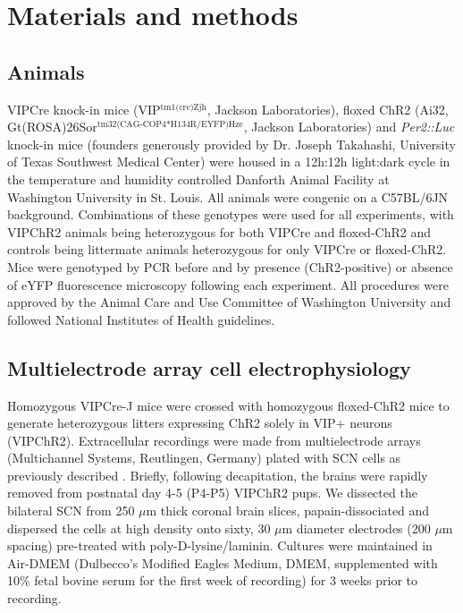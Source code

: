 \section{Materials and methods}

\subsection*{Animals}
VIPCre knock-in mice (VIP$^{\text{tm1(cre)Zjh}}$, Jackson Laboratories), floxed ChR2 (Ai32, Gt(ROSA)26Sor$^\text{tm32(CAG-COP4*H134R/EYFP)Hze}$, Jackson Laboratories) and \textit{Per2::Luc} \cite{Yoo2004} knock-in mice (founders generously provided by Dr. Joseph Takahashi, University of Texas Southwest Medical Center) were housed in a 12h:12h light:dark cycle in the temperature and humidity controlled Danforth Animal Facility at Washington University in St. Louis.
All animals were congenic on a C57BL/6JN background.
Combinations of these genotypes were used for all experiments, with VIPChR2 animals being heterozygous for both VIPCre and floxed-ChR2 and controls being littermate animals heterozygous for only VIPCre or floxed-ChR2.
Mice were genotyped by PCR before and by presence (ChR2-positive) or absence of eYFP fluorescence microscopy following each experiment.
All procedures were approved by the Animal Care and Use Committee of Washington University and followed National Institutes of Health guidelines.

\subsection*{Multielectrode array cell electrophysiology}
Homozygous VIPCre-J mice were crossed with homozygous floxed-ChR2 mice to generate heterozygous litters expressing ChR2 solely in VIP+ neurons (VIPChR2).
Extracellular recordings were made from multielectrode arrays (Multichannel Systems, Reutlingen, Germany) plated with SCN cells as previously described \cite{Aton2005, Webb2012, Freeman2013a}.
Briefly, following decapitation, the brains were rapidly removed from postnatal day 4-5 (P4-P5) VIPChR2 pups.
We dissected the bilateral SCN from 250 $\mu$m thick coronal brain slices, papain-dissociated and dispersed the cells at high density onto sixty, 30 $\mu$m diameter electrodes (200 $\mu$m spacing) pre-treated with poly-D-lysine/laminin.
Cultures were maintained in Air-DMEM (Dulbecco’s Modified Eagles Medium, DMEM, supplemented with 10\% fetal bovine serum for the first week of recording) for 3 weeks prior to recording.

